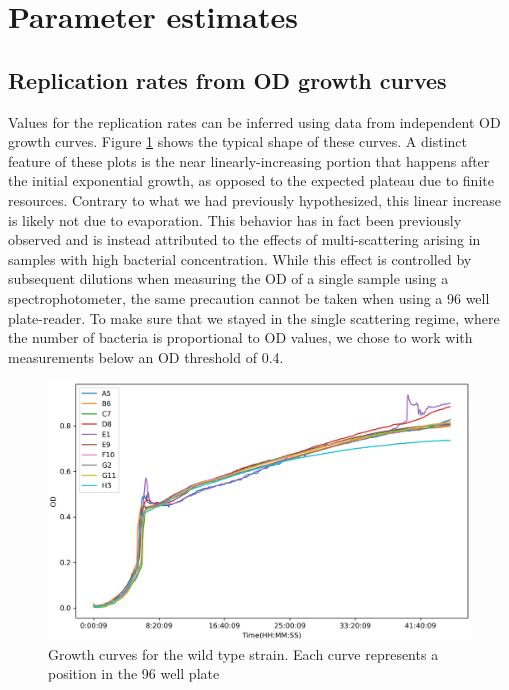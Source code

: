 \documentclass[10pt,a4paper]{scrartcl}
\begin{document}
\section{Parameter estimates}


\subsection{Replication rates from OD growth curves}




Values for the replication rates can be inferred using data from independent OD growth curves. Figure \ref{fig:gc_wt} shows the typical shape of these curves. A distinct feature of these plots is the near linearly-increasing portion that happens after the initial exponential growth, as opposed to the expected plateau due to finite resources. Contrary to what we had previously hypothesized, this linear increase is likely not due to evaporation. This behavior has in fact been previously observed \cite{stevenson_general_2016} and is instead attributed to the effects of multi-scattering arising in samples with high bacterial concentration. While this effect is controlled by subsequent dilutions when measuring the OD of a single sample using a spectrophotometer, the same precaution cannot be taken when using a 96 well plate-reader. To make sure that we stayed in the single scattering regime, where the number of bacteria is proportional to OD values, we chose to work with measurements below an OD threshold of 0.4.

\begin{figure}[H]
    \centering
    \includegraphics[scale = 0.7]{plots/gc.png}
    \caption{Growth curves for the wild type strain. Each curve represents a position in the 96 well plate}
    \label{fig:gc_wt}
\end{figure}
\end{document}
